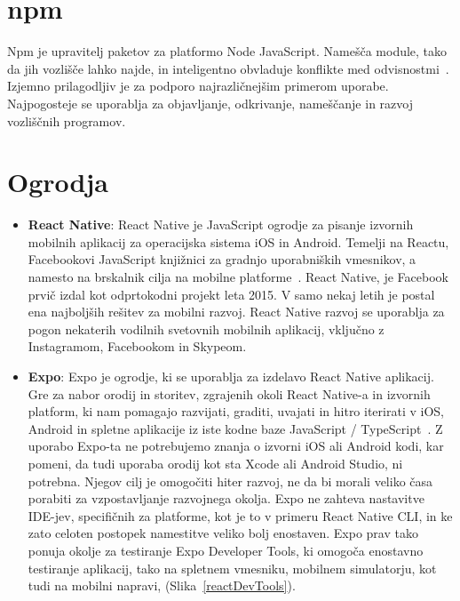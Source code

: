 \documentclass[a4paper, 12pt]{book}
\begin{document}
\section{npm}
Npm je upravitelj paketov za platformo Node JavaScript. Namešča module, tako da jih vozlišče lahko najde, in inteligentno obvladuje konflikte med odvisnostmi~\cite{npm}.  Izjemno prilagodljiv je za podporo najrazličnejšim primerom uporabe. Najpogosteje se uporablja za objavljanje, odkrivanje, nameščanje in razvoj vozliščnih programov.

\section{Ogrodja}
 \begin{itemize}
  \item \textbf{React Native}: React Native je JavaScript ogrodje za pisanje izvornih mobilnih aplikacij za operacijska sistema iOS in Android. Temelji na Reactu, Facebookovi JavaScript knjižnici za gradnjo uporabniških vmesnikov, a namesto na brskalnik cilja na mobilne platforme~\cite{RN}. 
React Native, je Facebook prvič izdal kot odprtokodni projekt leta 2015. V samo nekaj letih je postal ena najboljših rešitev za mobilni razvoj. React Native razvoj se uporablja za pogon nekaterih vodilnih svetovnih mobilnih aplikacij, vključno z Instagramom, Facebookom in Skypeom.
  
  \item \textbf{Expo}: Expo je ogrodje, ki se uporablja za izdelavo React Native aplikacij. Gre za nabor orodij in storitev, zgrajenih okoli React Native-a in izvornih platform, ki nam pomagajo razvijati, graditi, uvajati in hitro iterirati v iOS, Android in spletne aplikacije iz iste kodne baze JavaScript / TypeScript~\cite{EXPO}. Z uporabo Expo-ta ne potrebujemo znanja o izvorni iOS ali Android kodi, kar pomeni, da tudi uporaba orodij kot sta Xcode ali Android Studio, ni potrebna. Njegov cilj je omogočiti hiter razvoj, ne da bi morali veliko časa porabiti za vzpostavljanje razvojnega okolja. Expo ne zahteva nastavitve IDE-jev, specifičnih za platforme, kot je to v primeru React Native CLI, in ke zato celoten postopek namestitve veliko bolj enostaven. Expo prav tako ponuja okolje za testiranje Expo Developer Tools, ki omogoča enostavno testiranje aplikacij, tako na spletnem vmesniku, mobilnem simulatorju, kot tudi na mobilni napravi, (Slika~\ref{reactDevTools}).
  

\end{itemize}
\end{document}
